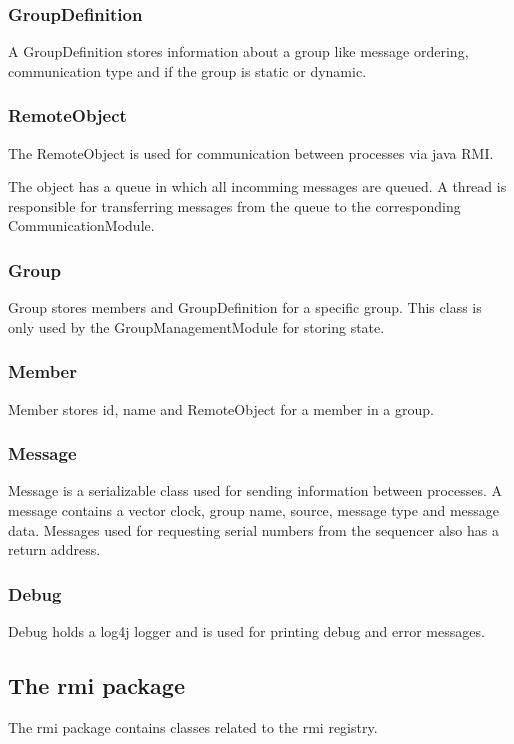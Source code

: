 \documentclass[a4paper,english]{article}
\begin{document}
\subsubsection{GroupDefinition}
A GroupDefinition stores information about a group like message ordering, communication type and if the group is static or dynamic. 

\subsubsection{RemoteObject}
The RemoteObject is used for communication between processes via java RMI. 

The object has a queue in which all incomming messages are queued. A thread is responsible for transferring messages from the queue to the corresponding CommunicationModule.

\subsubsection{Group}
Group stores members and GroupDefinition for a specific group. This class is only used by the GroupManagementModule for storing state.

\subsubsection{Member}
Member stores id, name and RemoteObject for a member in a group.

\subsubsection{Message}
Message is a serializable class used for sending information between processes. A message contains a vector clock, group name, source, message type and message data. Messages used for requesting serial numbers from the sequencer also has a return address.

\subsubsection{Debug}
Debug holds a log4j logger and is used for printing debug and error messages.

\subsection{The rmi package}
The rmi package contains classes related to the rmi registry. 
\end{document}
